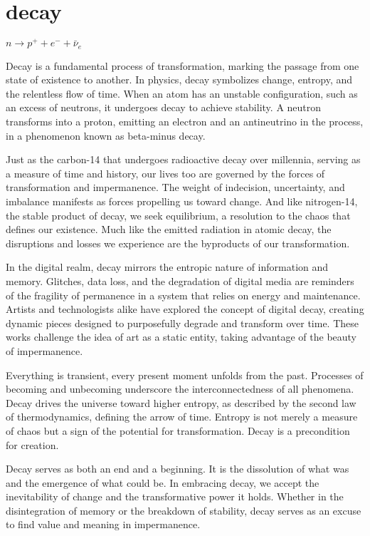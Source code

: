 \chapter*{decay}
\begin{center}
\vspace{2cm}
\begin{flushright}
\large
\textit{ $n \rightarrow p^+ + e^- + \bar{\nu}_e$ }
\end{flushright}
\vspace{2cm}
\end{center}
\normalsize

\newpage  %
Decay is a fundamental process of transformation, marking the passage from one state of existence to another. In physics, decay symbolizes change, entropy, and the relentless flow of time. When an atom has an unstable configuration, such as an excess of neutrons, it undergoes decay to achieve stability. A neutron transforms into a proton, emitting an electron and an antineutrino in the process, in a phenomenon known as beta-minus decay. 

Just as the carbon-14 that undergoes radioactive decay over millennia, serving as a measure of time and history, our lives too are governed by the forces of transformation and impermanence. The weight of indecision, uncertainty, and imbalance manifests as forces propelling us toward change. And like nitrogen-14, the stable product of decay, we seek equilibrium, a resolution to the chaos that defines our existence. Much like the emitted radiation in atomic decay, the disruptions and losses we experience are the byproducts of our transformation.

In the digital realm, decay mirrors the entropic nature of information and memory. Glitches, data loss, and the degradation of digital media are reminders of the fragility of permanence in a system that relies on energy and maintenance. Artists and technologists alike have explored the concept of digital decay, creating dynamic pieces designed to purposefully degrade and transform over time. These works challenge the idea of art as a static entity, taking advantage of the beauty of impermanence.

Everything is transient, every present moment unfolds from the past. Processes of becoming and unbecoming underscore the interconnectedness of all phenomena. Decay drives the universe toward higher entropy, as described by the second law of thermodynamics, defining the arrow of time. Entropy is not merely a measure of chaos but a sign of the potential for transformation. Decay is a precondition for creation.

Decay serves as both an end and a beginning. It is the dissolution of what was and the emergence of what could be. In embracing decay, we accept the inevitability of change and the transformative power it holds. Whether in the disintegration of memory or the breakdown of stability, decay serves as an excuse to find value and meaning in impermanence.
